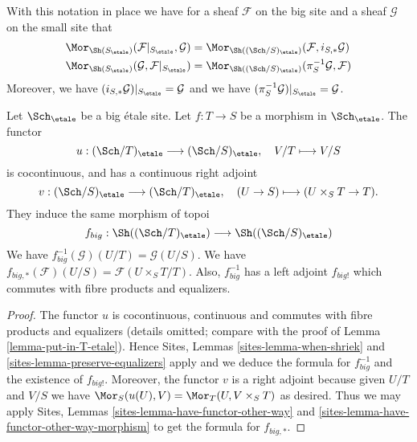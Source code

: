 \noindent
With this notation in place we have for a sheaf $\mathcal{F}$ on the
big site and a sheaf $\mathcal{G}$ on the small site that
\begin{align*}
\Mor_{\Sh(S_\etale)}(
\mathcal{F}|_{S_\etale},
\mathcal{G})
& =
\Mor_{\Sh((\Sch/S)_\etale)}(
\mathcal{F},
i_{S, *}\mathcal{G}) \\
\Mor_{\Sh(S_\etale)}(
\mathcal{G},
\mathcal{F}|_{S_\etale})
& =
\Mor_{\Sh((\Sch/S)_\etale)}(
\pi_S^{-1}\mathcal{G},
\mathcal{F})
\end{align*}
Moreover, we have $(i_{S, *}\mathcal{G})|_{S_\etale} = \mathcal{G}$
and we have $(\pi_S^{-1}\mathcal{G})|_{S_\etale} = \mathcal{G}$.

\begin{lemma}
\label{lemma-morphism-big-etale}
Let $\Sch_\etale$ be a big \'etale site.
Let $f : T \to S$ be a morphism in $\Sch_\etale$.
The functor
$$
u :
(\Sch/T)_\etale
\longrightarrow
(\Sch/S)_\etale,
\quad
V/T \longmapsto V/S
$$
is cocontinuous, and has a continuous right adjoint
$$
v :
(\Sch/S)_\etale
\longrightarrow
(\Sch/T)_\etale,
\quad
(U \to S) \longmapsto (U \times_S T \to T).
$$
They induce the same morphism of topoi
$$
f_{big} :
\Sh((\Sch/T)_\etale)
\longrightarrow
\Sh((\Sch/S)_\etale)
$$
We have $f_{big}^{-1}(\mathcal{G})(U/T) = \mathcal{G}(U/S)$.
We have $f_{big, *}(\mathcal{F})(U/S) = \mathcal{F}(U \times_S T/T)$.
Also, $f_{big}^{-1}$ has a left adjoint $f_{big!}$ which commutes with
fibre products and equalizers.
\end{lemma}

\begin{proof}
The functor $u$ is cocontinuous, continuous and commutes with fibre products
and equalizers (details omitted; compare with the proof of
Lemma \ref{lemma-put-in-T-etale}).
Hence
Sites, Lemmas \ref{sites-lemma-when-shriek} and
\ref{sites-lemma-preserve-equalizers}
apply and we deduce the formula
for $f_{big}^{-1}$ and the existence of $f_{big!}$. Moreover,
the functor $v$ is a right adjoint because given $U/T$ and $V/S$
we have $\Mor_S(u(U), V) = \Mor_T(U, V \times_S T)$
as desired. Thus we may apply
Sites, Lemmas \ref{sites-lemma-have-functor-other-way} and
\ref{sites-lemma-have-functor-other-way-morphism} to get the
formula for $f_{big, *}$.
\end{proof}

